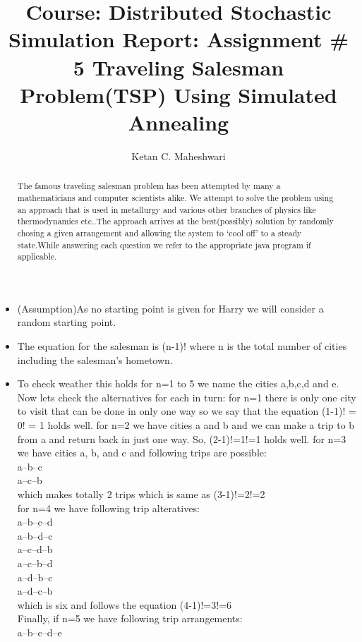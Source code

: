 \documentclass[a4paper,10pt]{report}
\title{ Course: Distributed Stochastic Simulation
 Report: Assignment \# 5
Traveling Salesman Problem(TSP) Using Simulated Annealing 
}
\author{Ketan C. Maheshwari}
\begin{document}
\maketitle

\begin{abstract}
The famous traveling salesman problem has been attempted by many a mathematicians and computer scientists alike. We attempt to solve the problem using an approach that is used in metallurgy and various other branches of physics like thermodynamics etc..The approach arrives at the best(possibly) solution by randomly chosing a given arrangement and allowing the system to `cool off' to a steady state.While answering each question we refer to the appropriate java program if applicable.
\end{abstract}
\begin{itemize}
\item (Assumption)As no starting point is given for Harry we will consider a random starting point.
\item The equation for the salesman is (n-1)! where n is the total number of cities including the salesman's hometown.
\item To check weather this holds for n=1 to 5 we name the cities a,b,c,d and e. Now lets check the alternatives for each in turn:
for n=1 there is only one city to visit that can be done in only one way so we say that the equation (1-1)! = 0! = 1 holds well.
for n=2 we have cities a and b and we can make a trip to b from a and return back in just one way. So, (2-1)!=1!=1 holds well.
for n=3 we have cities a, b, and c and following trips are possible:\\
        a--b--c\\
        a--c--b\\
which makes totally 2 trips which is same as (3-1)!=2!=2\\
for n=4 we have following trip alteratives:\\
        a--b--c--d\\
        a--b--d--c\\
        a--c--d--b\\
        a--c--b--d\\
        a--d--b--c\\
        a--d--c--b\\
which is six and follows the equation (4-1)!=3!=6\\
Finally, if n=5 we have following trip arrangements:\\
        a--b--c--d--e\\

\end{itemize}
\end{document}
